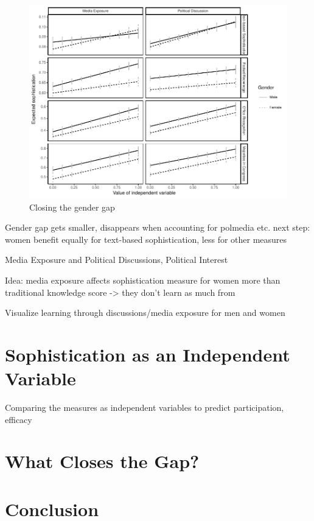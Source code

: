 \documentclass[12pt]{article}
\begin{document}
\begin{figure}[h]\centering
\includegraphics{../fig/closing.pdf}
\caption{Closing the gender gap}\label{fig:closing}
\end{figure}

Gender gap gets smaller, disappears when accounting for polmedia etc.
next step: women benefit equally for text-based sophistication, less for other measures



Media Exposure and Political Discussions, Political Interest

Idea: media exposure affects sophistication measure for women more than traditional knowledge score -> they don't learn as much from

Visualize learning through discussions/media exposure for men and women


\section*{Sophistication as an Independent Variable}

Comparing the measures as independent variables to predict participation, efficacy

\section*{What Closes the Gap?}



\section*{Conclusion}
\end{document}
